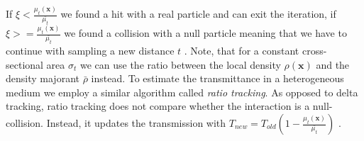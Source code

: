 If $\xi<\frac{\mu_t(\boldsymbol{x})}{\bar{\mu_t}}$ we found a hit with a real particle and can exit the iteration, if $\xi>=\frac{\mu_t(\boldsymbol{x})}{\bar{\mu_t}}$ we found a collision with a null particle meaning that we have to continue with sampling a new distance $t$ \cite{spectral_and_decomposition_tracking}.
Note, that for a constant cross-sectional area $\sigma_t$ we can use the ratio between the local density $\rho(\boldsymbol{x})$ and the density majorant $\bar{\rho}$ instead.
To estimate the transmittance in a heterogeneous medium we employ a similar algorithm called \textit{ratio tracking}.
As opposed to delta tracking, ratio tracking does not compare whether the interaction is a null-collision.
Instead, it updates the transmission with $T_{new} = T_{old}(1 - \frac{\mu_t(\boldsymbol{x})}{\bar{\mu_t}})$ \cite{novak_ratio_tracking}.

